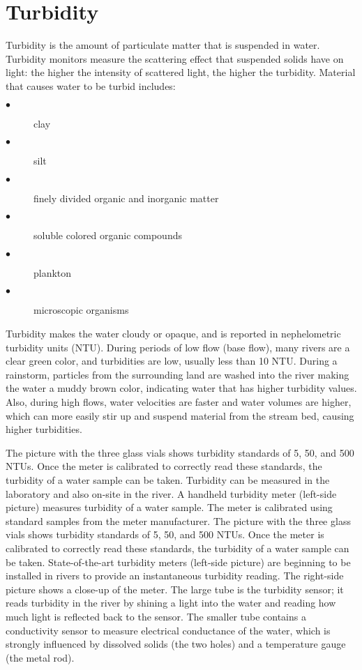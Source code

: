 \documentclass[a4paper]{article}
\begin{document}
\begin{minipage}[t]{0.45\textwidth}
\section*{\small Turbidity}
{\normalsize Turbidity is the amount of particulate matter that is suspended in water. Turbidity monitors measure the scattering effect that suspended solids have on light: the higher the intensity of scattered light, the higher the turbidity. Material that causes water to be turbid includes:
\begin{description}
  \item[$\bullet$ ] clay
  \item[$\bullet$ ] silt
  \item[$\bullet$ ] finely divided organic and inorganic matter
  \item[$\bullet$ ] soluble colored organic compounds
  \item[$\bullet$ ] plankton
  \item[$\bullet$ ] microscopic organisms
\end{description} 
Turbidity makes the water cloudy or opaque, and is reported in nephelometric turbidity units (NTU). During periods of low flow (base flow), many rivers are a clear green color, and turbidities are low, usually less than 10 NTU. During a rainstorm, particles from the surrounding land are washed into the river making the water a muddy brown color, indicating water that has higher turbidity values. Also, during high flows, water velocities are faster and water volumes are higher, which can more easily stir up and suspend material from the stream bed, causing higher turbidities.\\ \par
The picture with the three glass vials shows turbidity standards of 5, 50, and 500 NTUs. Once the meter is calibrated to correctly read these standards, the turbidity of a water sample can be taken. Turbidity can be measured in the laboratory and also on-site in the river. A handheld turbidity meter (left-side picture) measures turbidity of a water sample. The meter is calibrated using standard samples from the meter manufacturer. The picture with the three glass vials shows turbidity standards of 5, 50, and 500 NTUs. Once the meter is calibrated to correctly read these standards, the turbidity of a water sample can be taken. State-of-the-art turbidity meters (left-side picture) are beginning to be installed in rivers to provide an instantaneous turbidity reading. The right-side picture shows a close-up of the meter. The large tube is the turbidity sensor; it reads turbidity in the river by shining a light into the water and reading how much light is reflected back to the sensor. The smaller tube contains a conductivity sensor to measure electrical conductance of the water, which is strongly influenced by dissolved solids (the two holes) and a temperature gauge (the metal rod).}
\end{minipage}
\end{document}
